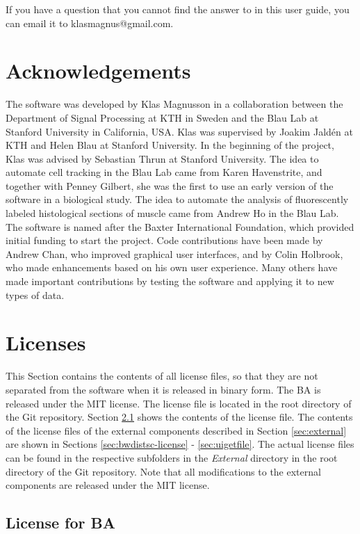\documentclass[a4paper, oneside, onecolumn, 11pt]{article}
\newcommand{\file}[1]{\emph{#1}}
\begin{document}
If you have a question that you cannot find the answer to in this user guide, you can email it to klasmagnus@gmail.com.

\section{Acknowledgements}
The software was developed by Klas Magnusson in a collaboration between the Department of Signal Processing at KTH in Sweden and the Blau Lab at Stanford University in California, USA. Klas was supervised by Joakim Jald\'{e}n at KTH and Helen Blau at Stanford University. In the beginning of the project, Klas was advised by Sebastian Thrun at Stanford University. The idea to automate cell tracking in the Blau Lab came from Karen Havenstrite, and together with Penney Gilbert, she was the first to use an early version of the software in a biological study. The idea to automate the analysis of fluorescently labeled histological sections of muscle came from Andrew Ho in the Blau Lab. The software is named after the Baxter International Foundation, which provided initial funding to start the project. Code contributions have been made by Andrew Chan, who improved graphical user interfaces, and by Colin Holbrook, who made enhancements based on his own user experience. Many others have made important contributions by testing the software and applying it to new types of data.

\section{Licenses}
\label {sec:licenses}
This Section contains the contents of all license files, so that they are not separated from the software when it is released in binary form. The BA is released under the MIT license. The license file is located in the root directory of the Git repository. Section \ref{sec:ba-license} shows the contents of the license file. The contents of the license files of the external components described in Section \ref{sec:external} are shown in Sections \ref{sec:bwdistsc-license} - \ref{sec:uigetfile}. The actual license files can be found in the respective subfolders in the \file{External} directory in the root directory of the Git repository. Note that all modifications to the external components are released under the MIT license.

\subsection{License for BA}
 \label{sec:ba-license}
\end{document}

